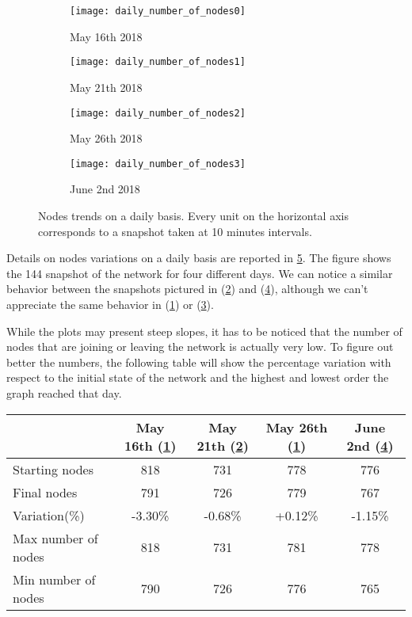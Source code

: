 	\begin{figure}[h]
		\centering
		\begin{subfigure}{0.45\textwidth}
			\centering
			\texttt{[image: daily\_number\_of\_nodes0]}
			\caption{May 16th 2018}
			\label{daily_node0}
		\end{subfigure}
		\begin{subfigure}{0.45\textwidth}
			\centering
			\texttt{[image: daily\_number\_of\_nodes1]}
			\caption{May 21th 2018}
			\label{daily_node1}
		\end{subfigure}
			\begin{subfigure}{0.45\textwidth}
			\centering
			\texttt{[image: daily\_number\_of\_nodes2]}
			\caption{May 26th 2018}
			\label{daily_node2}
		\end{subfigure}
		\begin{subfigure}{0.45\textwidth}
			\centering
			\texttt{[image: daily\_number\_of\_nodes3]}
			\caption{June 2nd 2018}
			\label{daily_node3}
		\end{subfigure}
		
		\caption{Nodes trends on a daily basis. Every unit on the horizontal axis corresponds to a snapshot taken at 10 minutes intervals.}
		\label{daily_nodes_variation}
	\end{figure}

	Details on nodes variations on a daily basis are reported in \ref{daily_nodes_variation}. The figure shows the 144 snapshot of the network for four different days. We can notice a similar behavior between the snapshots pictured in (\ref{daily_node1}) and (\ref{daily_node3}), although we can't appreciate the same behavior in (\ref{daily_node0}) or (\ref{daily_node2}). 
	
	While the plots may present steep slopes, it has to be noticed that the number of nodes that are joining or leaving the network is actually very low. To figure out better the numbers, the following table will show the percentage variation with respect to the initial state of the network and the highest and lowest order the graph reached that day.
	
	\begin{center}
		\begin{tabulary}{\linewidth}{| L | C | C | C | C |}
			\hline
			 & May 16th (\ref{daily_node0}) & May 21th (\ref{daily_node1}) & May 26th (\ref{daily_node0}) & June 2nd (\ref{daily_node3}) \\
			\hline
			Starting nodes & 818 & 731 & 778 & 776 \\ \hline
			Final nodes & 791 & 726 & 779 & 767 \\ \hline
			Variation(\%) & -3.30\% & -0.68\% & +0.12\% & -1.15\% \\ \hline
			Max number of nodes & 818 & 731 & 781 & 778 \\ \hline
			Min number of nodes & 790 & 726 & 776 & 765 \\ \hline

		\end{tabulary}
	\end{center}
	
